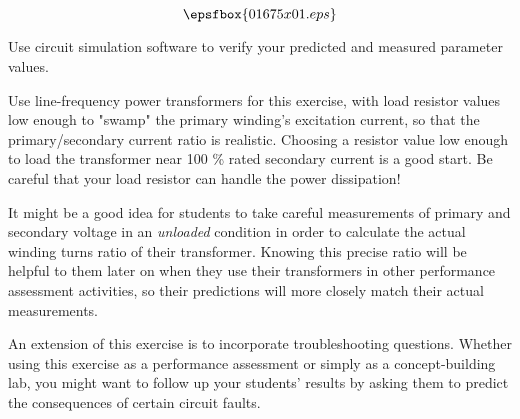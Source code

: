 

$$\epsfbox{01675x01.eps}$$

\vfil \eject






Use circuit simulation software to verify your predicted and measured parameter values.







Use line-frequency power transformers for this exercise, with load resistor values low enough to "swamp" the primary winding's excitation current, so that the primary/secondary current ratio is realistic.  Choosing a resistor value low enough to load the transformer near 100 \% rated secondary current is a good start.  Be careful that your load resistor can handle the power dissipation!

It might be a good idea for students to take careful measurements of primary and secondary voltage in an {\it unloaded} condition in order to calculate the actual winding turns ratio of their transformer.  Knowing this precise ratio will be helpful to them later on when they use their transformers in other performance assessment activities, so their predictions will more closely match their actual measurements.

An extension of this exercise is to incorporate troubleshooting questions.  Whether using this exercise as a performance assessment or simply as a concept-building lab, you might want to follow up your students' results by asking them to predict the consequences of certain circuit faults.




